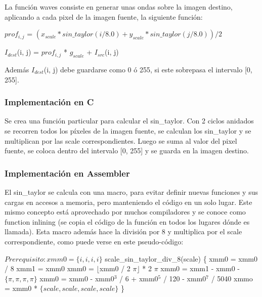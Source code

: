 La función waves consiste en generar unas ondas sobre la imagen destino, aplicando a cada pixel de la imagen fuente, la siguiente función:

$prof_{i,j}$ =
$(x_{scale} * sin\_taylor(i / 8.0) + y_{scale} * sin\_taylor(j / 8.0)) / 2$

$I_{dest}$(i, j) = $prof_{i,j}$ * $g_{scale}$ + $I_{src}$(i, j)

Además $I_{dest}$(i, j) debe guardarse como 0 ó 255, si este sobrepasa el intervalo [0, 255].

\subsubsection{Implementación en C}

Se crea una función particular para calcular el sin\_taylor.
Con 2 ciclos anidados se recorren todos los píxeles de la imagen fuente, se calculan los sin\_taylor y se multiplican por las scale correspondientes. Luego se suma al valor del pixel fuente, se coloca dentro del intervalo [0, 255] y se guarda en la imagen destino.

\subsubsection{Implementación en Assembler}

El sin\_taylor se calcula con una macro, para evitar definir nuevas funciones y sus cargas en accesos a memoria, pero manteniendo el código en un solo lugar. Este mismo concepto está aprovechado por muchos compiladores y se conoce como function inlining (se copia el código de la función en todos los lugares dónde es llamada).
Esta macro además hace la división por 8 y multiplica por el scale correspondiente, como puede verse en este pseudo-código:

\begin{pseudocodigo}
	\STATE $Prerequisito: xmm0 = \{i, i, i, i\}$ 
	\STATE scale\_sin\_taylor\_div\_8(scale) \{
    		\INDSTATE[2] xmm0 = xmm0 / 8
    		\INDSTATE[2] xmm1 = xmm0 
    		\INDSTATE[2] xmm0 = $\lfloor$xmm0 / 2 $\pi\rfloor$ * 2 $\pi$
    		\INDSTATE[2] xmm0 = xmm1 - xmm0 - $\{\pi, \pi, \pi, \pi\}$
    		\INDSTATE[2] xmm0 = xmm0 - xmm0$^{3}$ / 6 + xmm0$^{5}$ / 120 - xmm0$^{7}$ / 5040
    		\INDSTATE[2] xmmo = xmm0 * $\{scale, scale, scale, scale\}$
    \STATE \}
\end{pseudocodigo}


